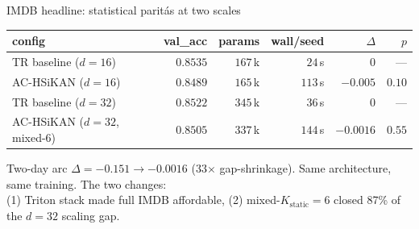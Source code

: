 \documentclass[aspectratio=169, 11pt]{beamer}
\begin{document}
\begin{frame}{IMDB headline: statistical paritás at two scales}
  \begin{center}\small
  \begin{tabular}{lrrrrr}
  \toprule
  config & val\_acc & params & wall/seed & $\Delta$ & $p$ \\
  \midrule
  TR baseline ($d=16$)             & $0.8535$ & $167$\,k & $24$\,s & $0$ & --- \\
  AC-HSiKAN ($d=16$)                & $0.8489$ & $165$\,k & $113$\,s & $-0.005$ & $0.10$ \\
  TR baseline ($d=32$)             & $0.8522$ & $345$\,k & $36$\,s & $0$ & --- \\
  AC-HSiKAN ($d=32$, mixed-6)       & $\mathbf{0.8505}$ & $337$\,k & $144$\,s & $\mathbf{-0.0016}$ & $\mathbf{0.55}$ \\
  \bottomrule
  \end{tabular}
  \end{center}

  \vspace{2mm}
  \begin{block}{Two-day arc}
  \textbf{$\Delta = -0.151 \to -0.0016$} (33$\times$ gap-shrinkage).
  Same architecture, same training. The two changes:
  \\
  (1) Triton stack made full IMDB affordable, (2) mixed-$K_{\text{static}}=6$
  closed 87\% of the $d=32$ scaling gap.
  \end{block}

  \centering
  \resizebox{0.85\textwidth}{!}{}
\end{frame}
\end{document}
